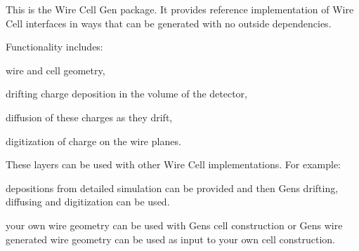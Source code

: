 This is the Wire Cell Gen package. It provides reference implementation of Wire Cell interfaces in ways that can be generated with no outside dependencies.

Functionality includes\+:


\begin{DoxyItemize}
\item wire and cell geometry,
\item drifting charge deposition in the volume of the detector,
\item diffusion of these charges as they drift,
\item digitization of charge on the wire planes.
\end{DoxyItemize}

These layers can be used with other Wire Cell implementations. For example\+:


\begin{DoxyItemize}
\item depositions from detailed simulation can be provided and then Gen\textquotesingle{}s drifting, diffusing and digitization can be used.
\item your own wire geometry can be used with Gen\textquotesingle{}s cell construction or Gen\textquotesingle{}s wire generated wire geometry can be used as input to your own cell construction. 
\end{DoxyItemize}
